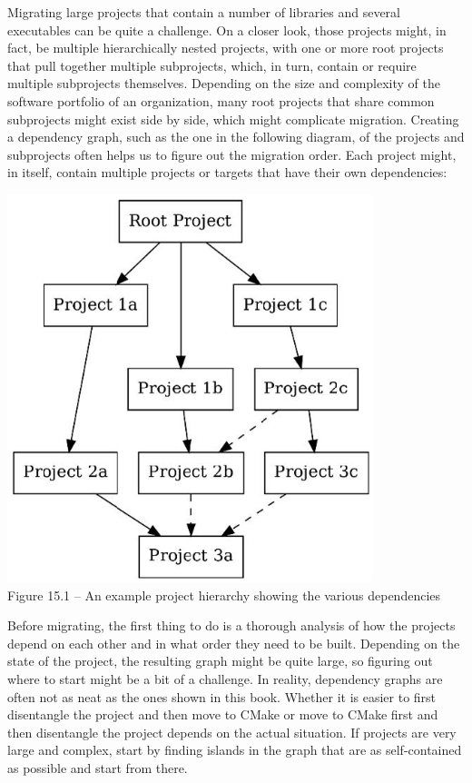 
Migrating large projects that contain a number of libraries and several executables can be quite a challenge. On a closer look, those projects might, in fact, be multiple hierarchically nested projects, with one or more root projects that pull together multiple subprojects, which, in turn, contain or require multiple subprojects themselves. Depending on the size and complexity of the software portfolio of an organization, many root projects that share common subprojects might exist side by side, which might complicate migration. Creating a dependency graph, such as the one in the following diagram, of the projects and subprojects often helps us to figure out the migration order. Each project might, in itself, contain multiple projects or targets that have their own dependencies:

\begin{center}
\includegraphics[width=0.8\textwidth]{content/3/chapter15/images/1.jpg}\\
Figure 15.1 – An example project hierarchy showing the various dependencies
\end{center}

Before migrating, the first thing to do is a thorough analysis of how the projects depend on each other and in what order they need to be built. Depending on the state of the project, the resulting graph might be quite large, so figuring out where to start might be a bit of a challenge. In reality, dependency graphs are often not as neat as the ones shown in this book. Whether it is easier to first disentangle the project and then move to CMake or move to CMake first and then disentangle the project depends on the actual situation. If projects are very large and complex, start by finding islands in the graph that are as self-contained as possible and start from there.

